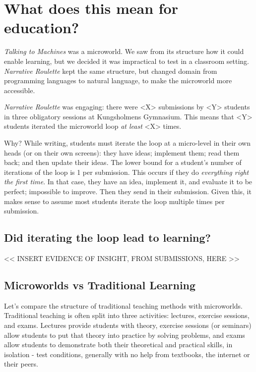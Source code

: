 \section{What does this mean for education?}

\emph{Talking to Machines} was a microworld. We saw from its structure
how it could enable learning, but we decided it was impractical to test
in a classroom setting. \emph{Narrative Roulette} kept the same
structure, but changed domain from programming languages to natural
language, to make the microworld more accessible.

\emph{Narrative Roulette} was engaging: there were
\textless{}X\textgreater{} submissions by \textless{}Y\textgreater{}
students in three obligatory sessions at Kungsholmens Gymnasium. This
means that \textless{}Y\textgreater{} students iterated the microworld
loop \emph{at least} \textless{}X\textgreater{} times.

Why? While writing, students must iterate the loop at a micro-level in
their own heads (or on their own screens): they have ideas; implement
them; read them back; and then update their ideas. The lower bound for a
student's number of iterations of the loop is 1 per submission. This
occurs if they do \emph{everything right the first time}. In that case,
they have an idea, implement it, and evaluate it to be perfect;
impossible to improve. Then they send in their submission. Given this,
it makes sense to assume most students iterate the loop multiple times
per submission.

\subsection{Did iterating the loop lead to learning?}

\textless{}\textless{} INSERT EVIDENCE OF INSIGHT, FROM SUBMISSIONS,
HERE \textgreater{}\textgreater{}

\subsection{Microworlds vs Traditional Learning}

Let's compare the structure of traditional teaching methods with
microworlds. Traditional teaching is often split into three activities:
lectures, exercise sessions, and exams. Lectures provide students with
theory, exercise sessions (or seminars) allow students to put that
theory into practice by solving problems, and exams allow students to
demonstrate both their theoretical and practical skills, in isolation -
test conditions, generally with no help from textbooks, the internet or
their peers.

